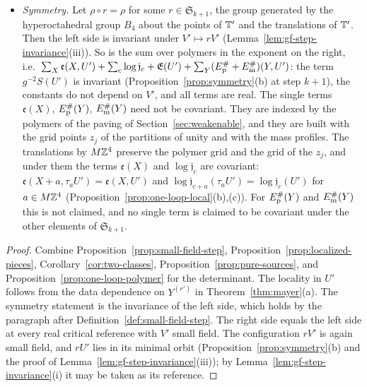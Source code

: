 \begin{theorem}
\begin{itemize}
\item \emph{Symmetry.} Let $\rho\circ r=\rho$ for some $r\in\mathfrak S_{k+1}$, the group generated by the hyperoctahedral group $B_4$ about the points of $\mathbb T'$ and the translations of $\mathbb T'$. Then the left side is invariant under $V'\mapsto rV'$ (Lemma~\ref{lem:gf-step-invariance}(iii)). So is the sum over polymers in the exponent on the right, i.e.\ $\sum_X\mathfrak e(X,U')+\sum_c\log\mathfrak j_c+\mathfrak E(U')+\sum_Y(E^\#_{\rm p}+E^\#_{\rm m})(Y,U')$: the term $g^{-2}S(U')$ is invariant (Proposition~\ref{prop:symmetry}(b) at step $k+1$), the constants do not depend on $V'$, and all terms are real. The single terms $\mathfrak e(X)$, $E^\#_{\rm p}(Y)$, $E^\#_{\rm m}(Y)$ need not be covariant. They are indexed by the polymers of the paving of Section~\ref{sec:weakenable}, and they are built with the grid points $z_j$ of the partitions of unity and with the mass profiles. The translations by $M\mathbb Z^4$ preserve the polymer grid and the grid of the $z_j$, and under them the terms $\mathfrak e(X)$ and $\log\mathfrak j_c$ are covariant: $\mathfrak e(X+a,\tau_aU')=\mathfrak e(X,U')$ and $\log\mathfrak j_{c+a}(\tau_aU')=\log\mathfrak j_c(U')$ for $a\in M\mathbb Z^4$ (Proposition~\ref{prop:one-loop-local}(b),(c)). For $E^\#_{\rm p}(Y)$ and $E^\#_{\rm m}(Y)$ this is not claimed, and no single term is claimed to be covariant under the other elements of $\mathfrak S_{k+1}$.
\end{itemize}
\end{theorem}

\begin{proof}
Combine Proposition~\ref{prop:small-field-step}, Proposition~\ref{prop:localized-pieces}, Corollary~\ref{cor:two-classes}, Proposition~\ref{prop:pure-sources}, and Proposition~\ref{prop:one-loop-polymer} for the determinant. The locality in $U'$ follows from the data dependence on $Y^{(r')}$ in Theorem~\ref{thm:mayer}(a). The symmetry statement is the invariance of the left side, which holds by the paragraph after Definition~\ref{def:small-field-step}. The right side equals the left side at every real critical reference with $V'$ small field. The configuration $rV'$ is again small field, and $rU'$ lies in its minimal orbit (Proposition~\ref{prop:symmetry}(b) and the proof of Lemma~\ref{lem:gf-step-invariance}(iii)); by Lemma~\ref{lem:gf-step-invariance}(i) it may be taken as its reference.
\end{proof}

